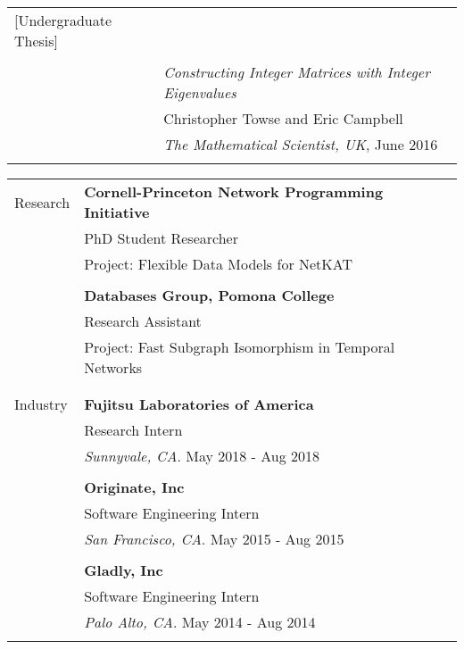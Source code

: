 \documentclass[letterpaper,11pt,oneside]{article}
\begin{document}
\begin{tabular}{@{} l l}
    \hfill [Undergraduate Thesis]
 \\
    & \\

    & \textit{Constructing Integer Matrices with Integer Eigenvalues} \\
    & Christopher Towse and Eric Campbell \\
    & \textit{The Mathematical Scientist, UK}, June 2016
 \\
    & \\
\end{tabular}

\begin{tabular}{@{} l l }
 \Large{Research}
     & \textbf{Cornell-Princeton Network Programming Initiative}\\
     & PhD Student Researcher\\
     & Project: Flexible Data Models for Net\textsc{KAT}\\ \\
     & \textbf{Databases Group, Pomona College} \\ 
     & Research Assistant \\
     & Project: Fast Subgraph Isomorphism in Temporal Networks  \\
     & \\ \\
 \Large{Industry}
     & \textbf{Fujitsu Laboratories of America} \\
     & Research Intern \\
     & \textit{Sunnyvale, CA}. May 2018 - Aug 2018 \\
     & \\
     & \textbf{Originate, Inc} \\
     & Software Engineering Intern \\
     & \textit{San Francisco, CA}. May 2015 - Aug 2015 \\
     & \\
     & \textbf{Gladly, Inc} \\
     & Software Engineering Intern \\
     & \textit{Palo Alto, CA}. May 2014 - Aug 2014 \\ \\
\end{tabular}
\end{document}
